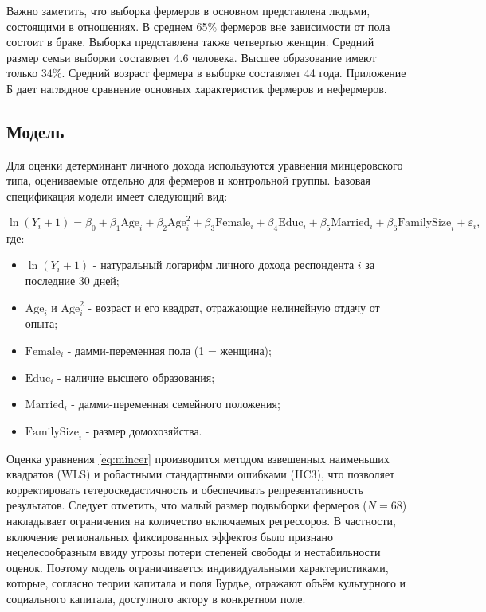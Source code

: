 \documentclass[14pt, a4paper]{article}
\begin{document}
	Важно заметить, что выборка фермеров в основном представлена людьми, состоящими в отношениях. В среднем 65\% фермеров вне зависимости от пола состоит в браке. Выборка представлена также четвертью женщин. Средний размер семьи выборки составляет 4.6 человека. Высшее образование имеют только 34\%. Средний возраст фермера в выборке составляет 44 года. Приложение Б дает наглядное сравнение основных характеристик фермеров и нефермеров. 
	
	\subsection{Модель}
	Для оценки детерминант личного дохода используются уравнения минцеровского типа, оцениваемые отдельно для фермеров и контрольной группы. Базовая спецификация модели имеет следующий вид:
	
	\begin{equation}
		\ln(Y_i + 1) = \beta_0 + \beta_1 \text{Age}_i + \beta_2 \text{Age}_i^2 + \beta_3 \text{Female}_i + \beta_4 \text{Educ}_i + \beta_5 \text{Married}_i + \beta_6 \text{FamilySize}_i + \varepsilon_i,
		\label{eq:mincer}
	\end{equation}
	где:
	\begin{itemize}
	\item $\ln(Y_i + 1)$ - натуральный логарифм личного дохода респондента $i$ за последние 30 дней; 
	\item $\text{Age}_i$ и $\text{Age}_i^2$ - возраст и его квадрат, отражающие нелинейную отдачу от опыта; 
	\item $\text{Female}_i$ - дамми-переменная пола (1 = женщина); 
	\item $\text{Educ}_i$ - наличие высшего образования; 
	\item $\text{Married}_i$ - дамми-переменная семейного положения; 
	\item $\text{FamilySize}_i$ - размер домохозяйства.
	\end{itemize}
	
	Оценка уравнения \eqref{eq:mincer} производится методом взвешенных наименьших квадратов (WLS) и робастными стандартными ошибками (HC3), что позволяет корректировать гетероскедастичность и обеспечивать репрезентативность результатов. Следует отметить, что малый размер подвыборки фермеров ($N = 68$) накладывает ограничения на количество включаемых регрессоров. В частности, включение региональных фиксированных эффектов было признано нецелесообразным ввиду угрозы потери степеней свободы и нестабильности оценок. Поэтому модель ограничивается индивидуальными характеристиками, которые, согласно теории капитала и поля Бурдье, отражают объём культурного и социального капитала, доступного актору в конкретном поле.
	
\end{document}
